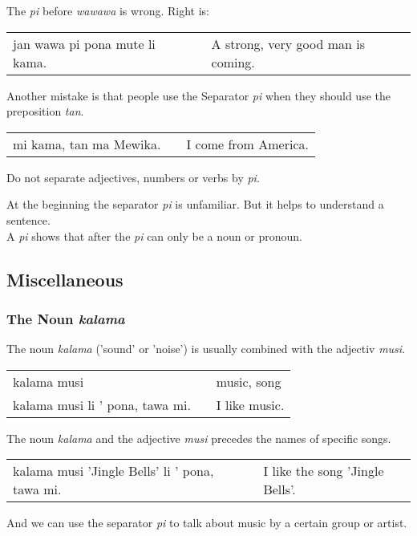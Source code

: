 The \textit{pi} before \textit{wawawa} is wrong.
Right is:

\begin{supertabular}{p{5,5cm}|ll}
    jan wawa pi pona mute li kama. &  & A strong, very good man is coming. \\
\end{supertabular}

Another mistake is that people use the Separator \textit{pi} when they should use the preposition \textit{tan}.

\begin{supertabular}{p{5,5cm}|ll}
    mi kama, tan ma Mewika. &  & I come from America. \\
\end{supertabular}

Do not separate adjectives, numbers or verbs by \textit{pi}.

At the beginning the separator \textit{pi} is unfamiliar.
But it helps to understand a sentence. \\
A \textit{pi} shows that after the \textit{pi} can only be a noun or pronoun.

\newpage
\subsection*{Miscellaneous}
\subsubsection*{The Noun \textit{kalama}}
The noun \textit{kalama} ('sound' or 'noise') is usually combined with the adjectiv \textit{musi}.

\begin{supertabular}{p{5,5cm}|ll}
    kalama musi                     &  & music, song   \\
    kalama musi li ' pona, tawa mi. &  & I like music. \\
\end{supertabular}

The noun \textit{kalama} and the adjective \textit{musi} precedes the names of specific songs.

\begin{supertabular}{p{5,5cm}|ll}
    kalama musi 'Jingle Bells' li ' pona, tawa mi. &  & I like the song 'Jingle Bells'. \\
\end{supertabular}

And we can use the separator \textit{pi} to talk about music by a certain group or artist.

